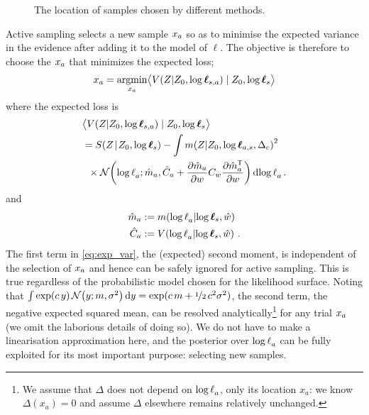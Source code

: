 \documentclass{article}
\begin{document}

\begin{figure}
\centering
{}
\caption{The location of samples chosen by different methods.}
\label{fig:sample_paths}
\end{figure}

Active sampling selects a new sample $\lfv_a$ so as to minimise the expected variance in the evidence after adding it to the model of $\ell$.  The objective is therefore to choose the $\lfv_a$ that minimizes the expected loss;
%
\begin{align}
\lfv_a = \argmin_{\lfv_a} \bigl\langle \cov{\If}{Z_0,\tvr_{s,a}}\mid Z_0,\tvr_{s}\bigr\rangle 
\end{align}
where the expected loss is
\begin{align}
&\bigl\langle \cov{\If}{Z_0,\tvr_{s,a}}\mid Z_0,\tvr_{s}\bigr\rangle 
\nonumber\\
 & = \secm{\If}{Z_0,\tvr_s} 
 - \int\mean{\If}{Z_0,\tvr_{a,s},\Delta_c}^2\nonumber\\
& \hspace{0.2cm}
\times\N{\tr_a}
{\hat{m}_a }
{\hat{C}_a +\pderiv{\hat{m}_a}{w}C_w\pderiv{\hat{m}\tra_a}{w}}
\ud\tr_a\,.\label{eq:exp_var}
\end{align}
and
\begin{align}
\hat{m}_a & \deq \mean{\tr_a}{\tvr_s,\hat{w}}\\ 
\hat{C}_a & \deq \cov{\tr_a}{\tvr_s,\hat{w}}\,.
\end{align}
The first term in \eqref{eq:exp_var}, the (expected) second moment, is independent of the selection of $\lfv_a$ and hence can be safely ignored for active sampling. This is true regardless of the probabilistic model chosen for the likelihood surface. 
Noting that $\int \exp(c\, y)\, \N{y}{m}{\sigma^2} \ud y = \exp(c\, m + \nicefrac{1}{2}\, c^2 \sigma^2)$, 
the second term, the negative expected squared mean, can be resolved analytically\footnote{We assume that $\Delta$ does not depend on $\tr_a$, only its location $x_a$: we know $\Delta(x_a) = 0$ and assume $\Delta$ elsewhere remains relatively unchanged.}
 for any trial $\lfv_a$ (we omit the laborious details of doing so). We do not have to make a linearisation approximation here, and the posterior over $\tr_a$ can be fully exploited for its most important purpose: selecting new samples. 
\end{document}
